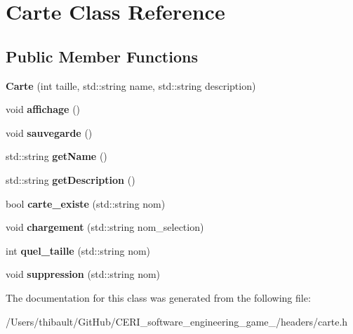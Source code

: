 \hypertarget{class_carte}{}\section{Carte Class Reference}
\label{class_carte}
\subsection*{Public Member Functions}
\begin{DoxyCompactItemize}
\item 
\mbox{\label{class_carte_a23c6f00e5cc97f469b8f8de4e37f54a9}} 
{\bfseries Carte} (int taille, std\+::string name, std\+::string description)
\item 
\mbox{\label{class_carte_aed4a23fad7ef43f46f80dbff08468cc9}} 
void {\bfseries affichage} ()
\item 
\mbox{\label{class_carte_aceb1051f87ed3c407bfcf25fe4cc7778}} 
void {\bfseries sauvegarde} ()
\item 
\mbox{\label{class_carte_a376e889c21215615bfa3b5068f46e646}} 
std\+::string {\bfseries get\+Name} ()
\item 
\mbox{\label{class_carte_a591705d6bb95c36ce4a034b3107ae85c}} 
std\+::string {\bfseries get\+Description} ()
\item 
\mbox{\label{class_carte_a25815ab5ece47d7df6fa5b845d03c785}} 
bool {\bfseries carte\+\_\+existe} (std\+::string nom)
\item 
\mbox{\label{class_carte_a3c64f88c1798cd90997f9835d06c81cc}} 
void {\bfseries chargement} (std\+::string nom\+\_\+selection)
\item 
\mbox{\label{class_carte_a0aa64d23c01e359285a557c847d71828}} 
int {\bfseries quel\+\_\+taille} (std\+::string nom)
\item 
\mbox{\label{class_carte_a5e06941d4f9af38e63b187f61277ba4d}} 
void {\bfseries suppression} (std\+::string nom)
\end{DoxyCompactItemize}


The documentation for this class was generated from the following file\+:\begin{DoxyCompactItemize}
\item 
/\+Users/thibault/\+Git\+Hub/\+C\+E\+R\+I\+\_\+software\+\_\+engineering\+\_\+game\+\_/headers/carte.\+h\end{DoxyCompactItemize}
